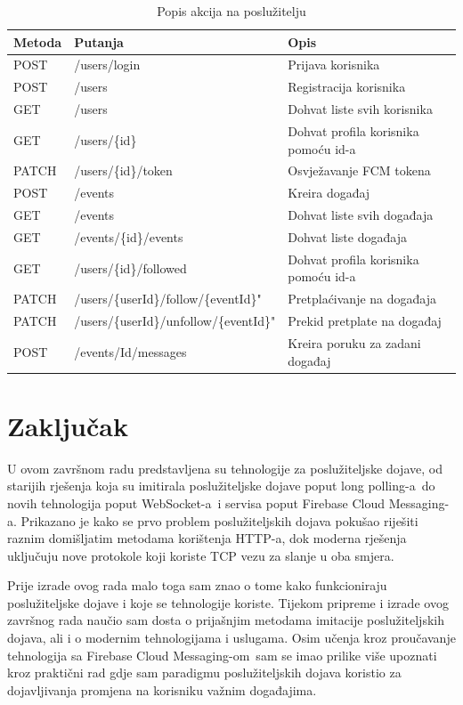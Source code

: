 \documentclass[times, utf8, zavrsni]{fer}
\begin{document}
\begin{table}[htb]
\caption{Popis akcija na poslužitelju}
\label{tbl:endpoints}
\centering
\begin{tabular}{lll} \hline
Metoda & Putanja & Opis\\ \hline
POST & /users/login & Prijava korisnika \\
POST & /users & Registracija korisnika \\
GET & /users & Dohvat liste svih korisnika  \\
GET & /users/\{id\} & Dohvat profila korisnika pomoću id-a \\
PATCH & /users/\{id\}/token & Osvježavanje FCM tokena \\
POST & /events & Kreira događaj \\
GET & /events & Dohvat liste svih događaja  \\
GET & /events/\{id\}/events & Dohvat liste događaja\\
GET & /users/\{id\}/followed & Dohvat profila korisnika pomoću id-a \\
PATCH & /users/\{userId\}/follow/\{eventId\}" & Pretplaćivanje na događaja \\
PATCH & /users/\{userId\}/unfollow/\{eventId\}" & Prekid pretplate na događaj \\
POST & /events/{Id}/messages & Kreira poruku za zadani događaj \\ \hline
\end{tabular}
\end{table}

\chapter{Zaključak}

U ovom završnom radu predstavljena su tehnologije za poslužiteljske dojave, od starijih rješenja koja su imitirala poslužiteljske dojave poput \glqq long polling-a\grqq\  do novih tehnologija poput \glqq WebSocket-a\grqq\  i servisa poput \glqq Firebase Cloud Messaging-a\grqq . Prikazano je kako se prvo problem poslužiteljskih dojava pokušao riješiti raznim domišljatim metodama korištenja HTTP-a, dok moderna rješenja uključuju nove protokole koji koriste TCP vezu za slanje u oba smjera.

Prije izrade ovog rada malo toga sam znao o tome kako funkcioniraju poslužiteljske dojave i koje se tehnologije koriste. Tijekom pripreme i izrade ovog završnog rada naučio sam dosta o prijašnjim metodama imitacije poslužiteljskih dojava, ali i o modernim tehnologijama i uslugama. Osim učenja kroz proučavanje tehnologija sa \glqq Firebase Cloud Messaging-om\grqq\  sam se imao prilike više upoznati kroz praktični rad gdje sam paradigmu poslužiteljskih dojava koristio za dojavljivanja promjena na korisniku važnim događajima.
\end{document}
